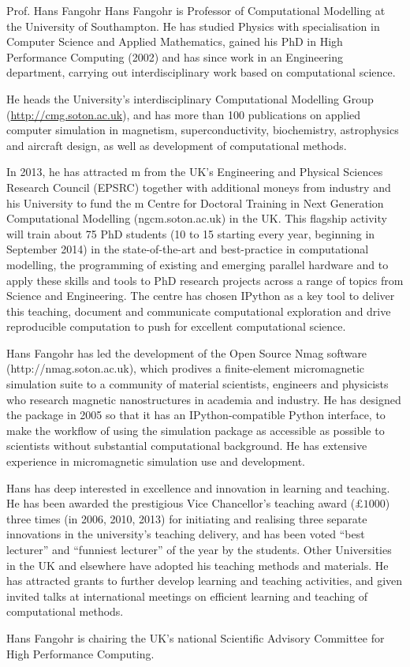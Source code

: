 \begin{picv}{Prof. Hans Fangohr}
  Hans Fangohr is Professor of Computational Modelling at the University of
  Southampton. He has studied Physics with specialisation in Computer Science and Applied
  Mathematics, gained his PhD in High Performance Computing (2002) and has since work in
  an Engineering department, carrying out interdisciplinary work based on computational
  science.

  He heads the University's interdisciplinary Computational Modelling Group
  (\url{http://cmg.soton.ac.uk}), and has more than 100 publications on applied computer
  simulation in magnetism, superconductivity, biochemistry, astrophysics and aircraft
  design, as well as development of computational methods.


  In 2013, he has attracted m from the UK's Engineering and Physical Sciences
  Research Council (EPSRC) together with additional moneys from industry and his
  University to fund the m Centre for Doctoral Training in Next Generation
  Computational Modelling (ngcm.soton.ac.uk) in the UK. This flagship activity will train
  about 75 PhD students (10 to 15 starting every year, beginning in September 2014) in the
  state-of-the-art and best-practice in computational modelling, the programming of
  existing and emerging parallel hardware and to apply these skills and tools to PhD
  research projects across a range of topics from Science and Engineering. The centre has
  chosen IPython as a key tool to deliver this teaching, document and communicate
  computational exploration and drive reproducible computation to push for excellent
  computational science.

  Hans Fangohr has led the development of the Open Source Nmag software
  (http://nmag.soton.ac.uk), which prodives a finite-element micromagnetic simulation
  suite to a community of material scientists, engineers and physicists who research
  magnetic nanostructures in academia and industry. He has designed the package in 2005 so
  that it has an IPython-compatible Python interface, to make the workflow of using the
  simulation package as accessible as possible to scientists without substantial
  computational background. He has extensive experience in micromagnetic simulation use
  and development.

  Hans has deep interested in excellence and innovation in learning and teaching. He has
  been awarded the prestigious Vice Chancellor’s teaching award ($\pounds 1000$) three
  times (in 2006, 2010, 2013) for initiating and realising three separate innovations in
  the university's teaching delivery, and has been voted ``best lecturer'' and ``funniest
  lecturer'' of the year by the students. Other Universities in the UK and elsewhere have
  adopted his teaching methods and materials. He has attracted grants to further develop
  learning and teaching activities, and given invited talks at international meetings on
  efficient learning and teaching of computational methods.
 
  Hans Fangohr is chairing the UK's national Scientific Advisory Committee for High
  Performance Computing.
\end{picv}



